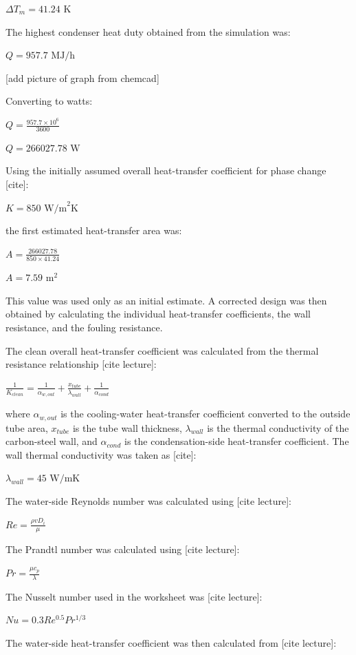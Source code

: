 \(\Delta T_m = 41.24 \text{ K}\)

The highest condenser heat duty obtained from the simulation was:

\(Q = 957.7 \text{ MJ/h}\)

{[}add picture of graph from chemcad{]}

Converting to watts:

\(Q = \frac{957.7 \times 10^6}{3600}\)

\(Q = 266027.78 \text{ W}\)

Using the initially assumed overall heat-transfer coefficient for phase
change {[}cite{]}:

\(K = 850 \text{ W/m}^2\text{K}\)

the first estimated heat-transfer area was:

\(A = \frac{266027.78}{850 \times 41.24}\)

\(A = 7.59 \text{ m}^2\)

This value was used only as an initial estimate. A corrected design was
then obtained by calculating the individual heat-transfer coefficients,
the wall resistance, and the fouling resistance.

The clean overall heat-transfer coefficient was calculated from the
thermal resistance relationship {[}cite lecture{]}:

\(\frac{1}{K_{clean}} = \frac{1}{\alpha_{w,out}} + \frac{x_{tube}}{\lambda_{wall}} + \frac{1}{\alpha_{cond}}\)

where \(\alpha_{w,out}\) is the cooling-water heat-transfer coefficient
converted to the outside tube area, \(x_{tube}\) is the tube wall
thickness, \(\lambda_{wall}\) is the thermal conductivity of the
carbon-steel wall, and \(\alpha_{cond}\) is the condensation-side
heat-transfer coefficient. The wall thermal conductivity was taken as
{[}cite{]}:

\(\lambda_{wall} = 45 \text{ W/mK}\)

The water-side Reynolds number was calculated using {[}cite lecture{]}:

\(Re = \frac{\rho v D_i}{\mu}\)

The Prandtl number was calculated using {[}cite lecture{]}:

\(Pr = \frac{\mu c_p}{\lambda}\)

The Nusselt number used in the worksheet was {[}cite lecture{]}:

\(Nu = 0.3 Re^{0.5} Pr^{1/3}\)

The water-side heat-transfer coefficient was then calculated from
{[}cite lecture{]}:

